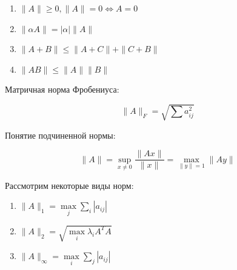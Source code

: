 \documentclass[10pt,a4paper]{article}
\begin{document}
			\begin{enumerate}
				\item $\parallel A\parallel \geq 0, \parallel A \parallel = 0 \Leftrightarrow A = 0$
				\item $\parallel \alpha A \parallel = \left|\alpha\right| \parallel A\parallel$
				\item $\parallel A + B \parallel \leq \parallel A + C \parallel + \parallel C + B\parallel$
				\item $\parallel AB\parallel \leq \parallel A\parallel \parallel B\parallel$
			\end{enumerate}
			
			Матричная норма Фробениуса:
			
			\begin{equation}
				\parallel A\parallel_{F} = \sqrt{\sum a_{ij}^{2}}
			\end{equation}
			
			Понятие подчиненной нормы:
			
			\begin{equation}
				\parallel A\parallel = \sup\limits_{x \neq 0} \frac{\parallel A x\parallel}{\parallel x\parallel}	= \max\limits_{\parallel y\parallel = 1} \parallel A y\parallel
			\end{equation}
			
			Рассмотрим некоторые виды норм:
			
			\begin{enumerate}
				\item $\parallel A\parallel_{1} = \max\limits_{j}\sum\limits_{i}\left|a_{ij}\right|$
				\item $\parallel A\parallel_{2} = \sqrt{\max\limits_{i}\lambda_{i}A^{T}A}$
				\item $\parallel A\parallel_{\infty} = \max\limits_{i}\sum\limits_{j}\left|a_{ij}\right|$
			\end{enumerate}						 
\end{document}
